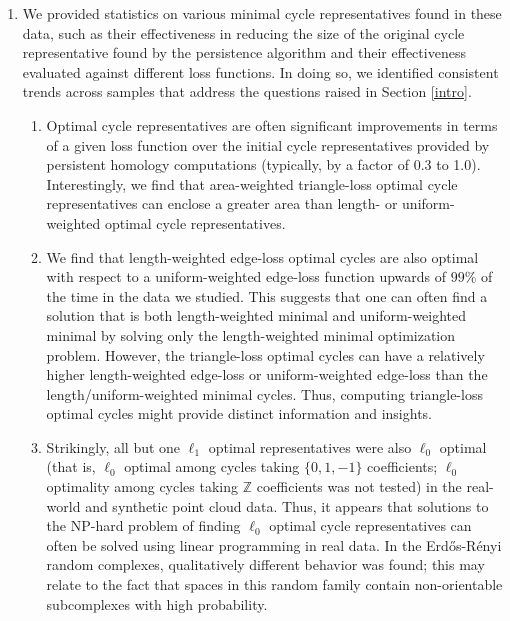 \documentclass[11pt,onecolumn]{article}
\newcommand{\Z}{\mathbb{Z}}
\newcommand{\se}{Section }
\theoremstyle{plain}
\theoremstyle{definition}
\begin{document}
\begin{enumerate}
    \item We provided statistics on various minimal cycle representatives found in these data, such as their effectiveness in reducing the size of the original cycle representative found by the persistence algorithm and their effectiveness evaluated against different loss functions. In doing so, we identified consistent trends across samples that address the questions raised in \se \ref{intro}.
    \begin{enumerate}
        \item Optimal cycle representatives are often significant improvements in terms of a given loss function over the initial cycle representatives provided by persistent homology computations (typically, by a factor of 0.3 to 1.0). Interestingly, we find that area-weighted triangle-loss optimal cycle representatives can enclose a greater area than length- or uniform-weighted optimal cycle representatives.  
        \item We find that length-weighted edge-loss optimal cycles are also optimal with respect to a uniform-weighted edge-loss function upwards of $99\%$ of the time in the data we studied. This suggests that one can often find a solution that is both length-weighted minimal and uniform-weighted minimal by solving only the length-weighted minimal optimization problem. However, the triangle-loss optimal cycles can have a relatively higher length-weighted edge-loss or uniform-weighted edge-loss than the length/uniform-weighted minimal cycles. Thus, computing triangle-loss optimal cycles might provide distinct information and insights. 
        \item Strikingly, all but one $\ell_1$ optimal representatives were also $\ell_0$ optimal (that is, $\ell_0$ optimal among cycles taking $\{0,1,-1\}$ coefficients;  $\ell_0$ optimality among cycles taking $\Z$ coefficients was not tested) in the real-world and synthetic point cloud data. Thus, it appears that solutions to the NP-hard problem of finding $\ell_0$ optimal cycle representatives can often be solved using linear programming in real data. In the Erd\H{o}s-R\'enyi random complexes, qualitatively different behavior was found; this may relate to the fact that spaces in this random family contain non-orientable subcomplexes with high probability.
    \end{enumerate}


\end{enumerate}
\end{document}
